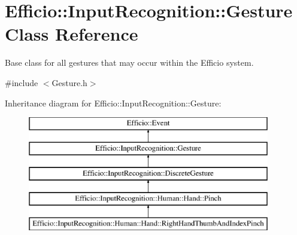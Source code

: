\hypertarget{class_efficio_1_1_input_recognition_1_1_gesture}{}\section{Efficio\+:\+:Input\+Recognition\+:\+:Gesture Class Reference}
\label{class_efficio_1_1_input_recognition_1_1_gesture}


Base class for all gestures that may occur within the Efficio system.  




{\ttfamily \#include $<$Gesture.\+h$>$}

Inheritance diagram for Efficio\+:\+:Input\+Recognition\+:\+:Gesture\+:\begin{figure}[H]
\begin{center}
\leavevmode
\includegraphics[height=5.000000cm]{class_efficio_1_1_input_recognition_1_1_gesture}
\end{center}
\end{figure}
